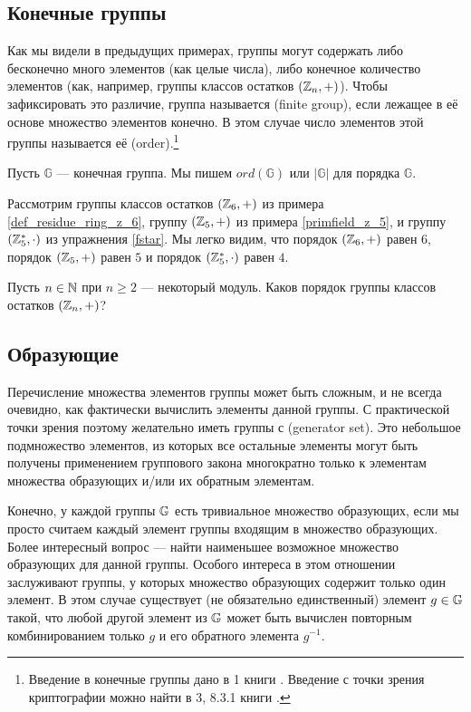\subsection{Конечные группы}
\label{sec:finite-groups}
 Как мы видели в предыдущих примерах, группы могут содержать либо бесконечно много элементов (как целые числа), либо конечное количество элементов (как, например, группы классов остатков $(\mathbb{Z}_n,+)$). Чтобы зафиксировать это различие, группа называется  (finite group), если лежащее в её основе множество элементов конечно. В этом случае число элементов этой группы называется её  (order).\footnote{Введение в конечные группы дано в \chaptname{} 1 книги \cite{fuchs-2015}. Введение с точки зрения криптографии можно найти в \chaptname{} 3, \secname{} 8.3.1 книги \cite{katz-2007}.}
\begin{notation}
Пусть $\mathbb{G}$ — конечная группа. Мы пишем $ord(\mathbb{G})$ или $|\mathbb{G}|$ для порядка $\mathbb{G}$.
\end{notation}
\begin{example}\label{example:Zn}
Рассмотрим группы классов остатков $(\mathbb{Z}_6,+)$ из примера \ref{def_residue_ring_z_6}, группу $(\mathbb{Z}_5,+)$ из примера \ref{primfield_z_5}, и группу $(\mathbb{Z}_5^*,\cdot)$ из упражнения \ref{fstar}. Мы легко видим, что порядок $(\mathbb{Z}_6,+)$ равен $6$, порядок $(\mathbb{Z}_5,+)$ равен $5$ и порядок $(\mathbb{Z}_5^*,\cdot)$ равен $4$.
\end{example}
\begin{exercise}
\label{ex:Zn} Пусть $n\in\mathbb{N}$ при $n\geq 2$ — некоторый модуль. Каков порядок группы классов остатков $(\mathbb{Z}_n,+)$?
\end{exercise}
\subsection{Образующие}\label{generators} Перечисление множества элементов группы может быть {сложным}, и не всегда очевидно, как фактически вычислить элементы данной группы. С практической точки зрения поэтому желательно иметь группы с  (generator set). Это небольшое подмножество элементов, из которых все остальные элементы могут быть получены применением группового закона многократно только к элементам множества образующих и/или их обратным элементам. 

Конечно, у каждой группы $\mathbb{G}$ есть тривиальное множество образующих, если мы просто считаем каждый элемент группы входящим в множество образующих. Более интересный вопрос — найти наименьшее возможное множество образующих для данной группы. Особого интереса в этом отношении заслуживают группы, у которых множество образующих содержит только один элемент. В этом случае существует (не обязательно единственный) элемент $g\in\mathbb{G}$ такой, что любой другой элемент из $\mathbb{G}$ может быть вычислен повторным комбинированием только $g$ и его обратного элемента $g^{-1}$. 

